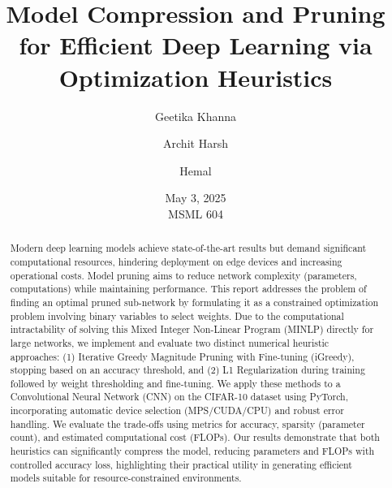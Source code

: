 \documentclass[10pt, article]{article} %
\title{Model Compression and Pruning for Efficient Deep Learning via Optimization Heuristics}
\author{Geetika Khanna \and Archit Harsh \and Hemal}
\date{May 3, 2025 \\ MSML 604} %
\begin{document}
\maketitle

\begin{abstract}
Modern deep learning models achieve state-of-the-art results but demand significant computational resources, hindering deployment on edge devices and increasing operational costs. Model pruning aims to reduce network complexity (parameters, computations) while maintaining performance. This report addresses the problem of finding an optimal pruned sub-network by formulating it as a constrained optimization problem involving binary variables to select weights. Due to the computational intractability of solving this Mixed Integer Non-Linear Program (MINLP) directly for large networks, we implement and evaluate two distinct numerical heuristic approaches: (1) Iterative Greedy Magnitude Pruning with Fine-tuning (iGreedy), stopping based on an accuracy threshold, and (2) L1 Regularization during training followed by weight thresholding and fine-tuning. We apply these methods to a Convolutional Neural Network (CNN) on the CIFAR-10 dataset using PyTorch, incorporating automatic device selection (MPS/CUDA/CPU) and robust error handling. We evaluate the trade-offs using metrics for accuracy, sparsity (parameter count), and estimated computational cost (FLOPs). Our results demonstrate that both heuristics can significantly compress the model, reducing parameters and FLOPs with controlled accuracy loss, highlighting their practical utility in generating efficient models suitable for resource-constrained environments.
\end{abstract}

\end{document}
